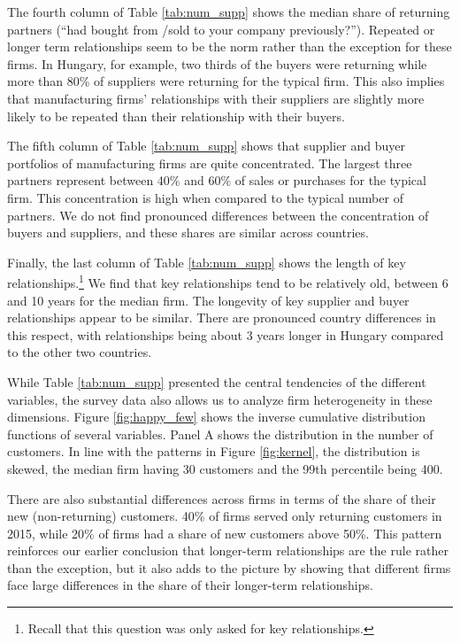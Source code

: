 \documentclass[final, dvipsnames, authoryear,12pt]{elsarticle}
\begin{document}
The fourth column of Table \ref{tab:num_supp} shows the median share of returning partners (``had bought from /sold to your company previously?''). Repeated or longer term relationships seem to be the norm rather than the exception for these firms. In Hungary, for example,  two thirds of the buyers were returning while more than 80\% of suppliers were returning for the typical firm. This also implies that manufacturing firms' relationships with their suppliers are slightly more likely to be repeated than their relationship with their buyers.

The fifth column of Table \ref{tab:num_supp} shows that supplier and buyer portfolios of manufacturing firms are quite concentrated. The largest three partners represent between 40\% and 60\% of sales or purchases for the typical firm. This concentration is high when compared to the typical number of partners. We do not find pronounced differences between the concentration of buyers and suppliers, and these shares are similar across countries.

Finally, the last column of Table \ref{tab:num_supp} shows the length of key relationships.\footnote{Recall that this question was only asked for key relationships.} We find that key relationships tend to be relatively old, between 6 and 10 years for the median firm. The longevity of key supplier and buyer relationships appear to be similar. There are pronounced country differences in this respect, with relationships being about 3 years longer in Hungary compared to the other two countries. 

While Table \ref{tab:num_supp} presented the central tendencies of the different variables, the survey data also allows us to analyze firm heterogeneity in these dimensions. Figure \ref{fig:happy_few} shows the inverse cumulative distribution functions of several variables. Panel A shows the distribution in the number of customers. In line with the patterns in Figure \ref{fig:kernel}, the distribution is skewed, the median firm having 30 customers and the 99th percentile being 400.

There are also substantial differences across firms in terms of the share of their new (non-returning) customers. 40\% of firms served only returning customers in 2015, while 20\% of firms had a share of new customers above 50\%. This pattern reinforces our earlier conclusion that longer-term relationships are the rule rather than the exception, but it also adds to the picture by showing that different firms face large differences in the share of their longer-term relationships.
\end{document}
